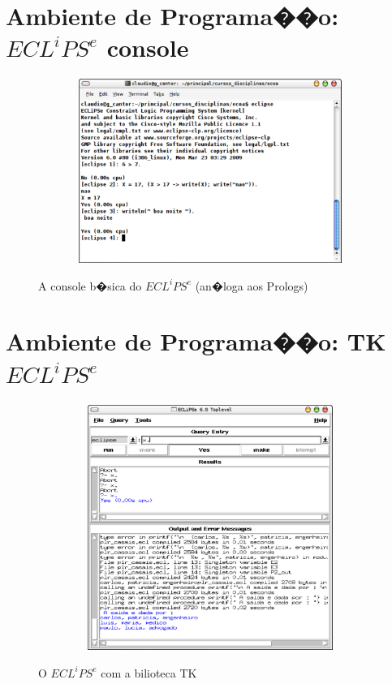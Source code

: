 \documentclass[final,a4paper]{article}
\begin{document}
\section{Ambiente de Programa��o: $ECL^iPS^e$ console}


\begin{figure}[!htb]
\centering
\includegraphics[width=14cm, height=6cm]{figuras/eclipse_console.pdf}
\label{console_01}
\caption{A console b�sica do $ECL^iPS^e$ (an�loga aos Prologs)}
\end{figure}


\section{Ambiente de Programa��o:  TK$ECL^iPS^e$}


\begin{figure}[!htb]
\centering
\includegraphics[width=15cm, height=8cm]{figuras/tkeclipse_1.pdf}
\label{tk_01}
\caption{O $ECL^iPS^e$ com a bilioteca TK}
\end{figure}

\end{document}
